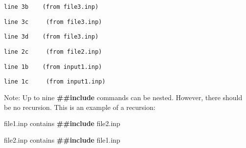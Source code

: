 \begin{lstlisting}
line 3b    (from file3.inp)
\end{lstlisting}

\begin{lstlisting}
line 3c     (from file3.inp)
\end{lstlisting}

\begin{lstlisting}
line 3d    (from file3.inp)
\end{lstlisting}

\begin{lstlisting}
line 2c     (from file2.inp)
\end{lstlisting}

\begin{lstlisting}
line 1b    (from input1.inp)
\end{lstlisting}

\begin{lstlisting}
line 1c     (from input1.inp)
\end{lstlisting}

Note: Up to nine \textbf{\#\#include} commands can be nested. However, there should be no recursion. This is an example of a recursion:

file1.inp contains \textbf{\#\#include} file2.inp

file2.inp contains \textbf{\#\#include} file1.inp
